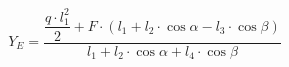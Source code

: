 \documentclass[preview]{standalone}
\begin{document}
\begin{align*}
Y_E  = \dfrac{\dfrac{q\cdot l_1^2}{2} + F\cdot (l_1+l_2\cdot \cos{\alpha}-l_3\cdot \cos{\beta})}{l_1 + l_2\cdot\cos{\alpha} + l_4\cdot\cos{\beta}}
\end{align*}
\end{document}

